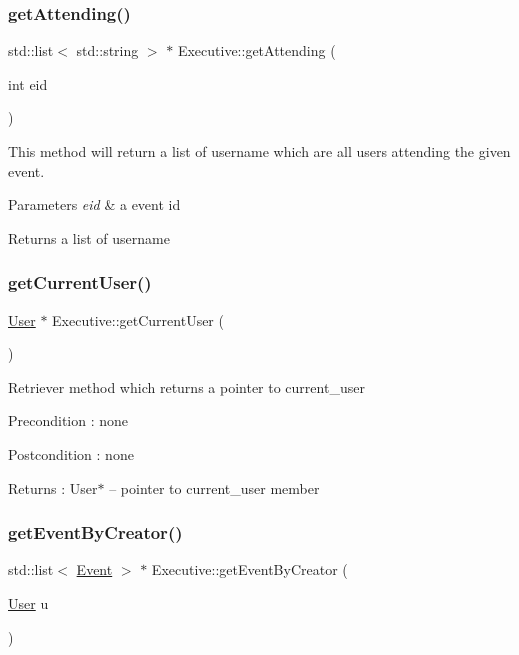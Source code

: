 \subsubsection{\texorpdfstring{get\+Attending()}{getAttending()}}
{\footnotesize\ttfamily std\+::list$<$ std\+::string $>$ $\ast$ Executive\+::get\+Attending (\begin{DoxyParamCaption}\item[{int}]{eid }\end{DoxyParamCaption})}

This method will return a list of username which are all users attending the given event. 
\begin{DoxyParams}{Parameters}
{\em eid} & a event id \\
\hline
\end{DoxyParams}
\begin{DoxyReturn}{Returns}
a list of username 
\end{DoxyReturn}
\mbox{\label{class_executive_a12621ad5db6ee3f111779a61ea82bba7}} 
\subsubsection{\texorpdfstring{get\+Current\+User()}{getCurrentUser()}}
{\footnotesize\ttfamily \mbox{\hyperlink{class_user}{User}} $\ast$ Executive\+::get\+Current\+User (\begin{DoxyParamCaption}{ }\end{DoxyParamCaption})}

Retriever method which returns a pointer to current\+\_\+user \begin{DoxyPrecond}{Precondition}
\+: none 
\end{DoxyPrecond}
\begin{DoxyPostcond}{Postcondition}
\+: none 
\end{DoxyPostcond}
\begin{DoxyReturn}{Returns}
\+: User$\ast$ -- pointer to current\+\_\+user member 
\end{DoxyReturn}
\mbox{\label{class_executive_a227a53f3d58c360c1248c9ccc3a47f58}} 
\subsubsection{\texorpdfstring{get\+Event\+By\+Creator()}{getEventByCreator()}}
{\footnotesize\ttfamily std\+::list$<$ \mbox{\hyperlink{class_event}{Event}} $>$ $\ast$ Executive\+::get\+Event\+By\+Creator (\begin{DoxyParamCaption}\item[{\mbox{\hyperlink{class_user}{User}}}]{u }\end{DoxyParamCaption})}

